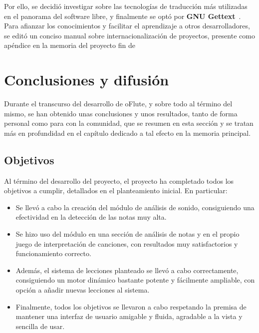 \documentclass[a4paper,11pt]{article}
\begin{document}
Por ello, se decidió investigar sobre las tecnologías de traducción más
utilizadas en el panorama del software libre, y finalmente se optó por
\textbf{GNU Gettext}~\cite{refgettext}. Para afianzar los conocimientos y
facilitar el aprendizaje a otros desarrolladores, se editó un conciso manual
sobre internacionalización de proyectos, presente como apéndice en la memoria del proyecto fin de



\section{Conclusiones y difusión}
Durante el transcurso del desarrollo de oFlute, y sobre todo al término del
mismo, se han obtenido unas conclusiones y unos resultados, tanto de forma
personal como para con la comunidad, que se resumen en esta sección y se tratan
más en profundidad en el capítulo dedicado a tal efecto en la memoria principal.

\subsection{Objetivos}
Al término del desarrollo del proyecto, el proyecto ha completado todos los
objetivos a cumplir, detallados en el planteamiento inicial. En particular:

\begin{itemize}
\item Se llevó a cabo la creación del módulo de análisis de sonido, consiguiendo
  una efectividad en la detección de las notas muy alta.
\item Se hizo uso del módulo en una sección de análisis de notas y en el propio
  juego de interpretación de canciones, con resultados muy satisfactorios y
  funcionamiento correcto.
\item Además, el sistema de lecciones planteado se llevó a cabo correctamente,
  consiguiendo un motor dinámico bastante potente y fácilmente ampliable, con
  opción a añadir nuevas lecciones al sistema.
\item Finalmente, todos los objetivos se llevaron a cabo respetando la premisa
  de mantener una interfaz de usuario amigable y fluida, agradable a la vista y
  sencilla de usar.
\end{itemize}
\end{document}
